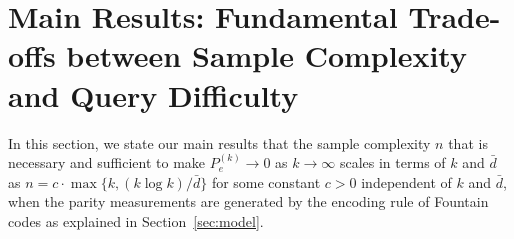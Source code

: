 \documentclass[11pt,onecolumn]{IEEEtran}
\begin{document}
\section{Main Results: Fundamental Trade-offs between Sample Complexity and Query Difficulty}\label{sec:main}

In this section, we state our main results that the sample complexity $n$ that is necessary and sufficient to make $P_e^{(k)}\to 0$ as $k\to\infty$ scales in terms of $k$ and $\bar{d}$ as $n=c\cdot\max\{k,({k\log k})/{\bar{d}}\}$ for some constant $c>0$ independent of $k$ and $\bar{d}$, when the parity measurements are generated by the encoding rule of Fountain codes as explained in Section~\ref{sec:model}. %
\end{document}
